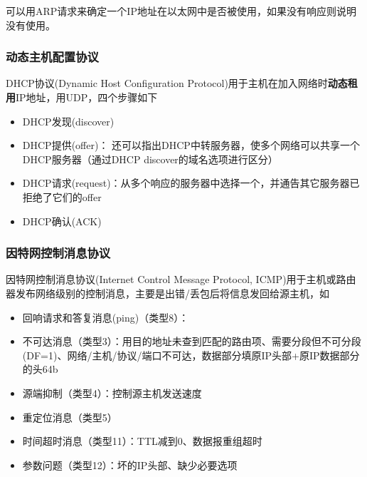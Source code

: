 可以用ARP请求来确定一个IP地址在以太网中是否被使用，如果没有响应则说明没有使用。

\subsubsection{动态主机配置协议}
DHCP协议(Dynamic Host Configuration Protocol)用于主机在加入网络时\textbf{动态租用}IP地址，用UDP，四个步骤如下
\begin{itemize}
	\item DHCP发现(discover)
	\item DHCP提供(offer)： 还可以指出DHCP中转服务器，使多个网络可以共享一个DHCP服务器（通过DHCP discover的域名选项进行区分）
	\item DHCP请求(request)：从多个响应的服务器中选择一个，并通告其它服务器已拒绝了它们的offer
	\item DHCP确认(ACK)
\end{itemize}

\subsubsection{因特网控制消息协议}
因特网控制消息协议(Internet Control Message Protocol, ICMP)用于主机或路由器发布网络级别的控制消息，主要是出错/丢包后将信息发回给源主机，如
\begin{itemize}
	\item 回响请求和答复消息(ping)（类型8）：
	\item 不可达消息（类型3）：用目的地址未查到匹配的路由项、需要分段但不可分段(DF=1)、网络/主机/协议/端口不可达，数据部分填原IP头部+原IP数据部分的头64b
	\item 源端抑制（类型4）：控制源主机发送速度
	\item 重定位消息（类型5）
	\item 时间超时消息（类型11）：TTL减到0、数据报重组超时
	\item 参数问题（类型12）：坏的IP头部、缺少必要选项
\end{itemize}

